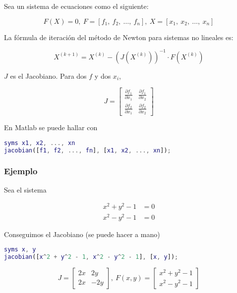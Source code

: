 \documentclass{article}
\begin{document}
Sea un sistema de ecuaciones como el siguiente:

\begin{equation*}
    F(X) = 0,\ F = \left[f_1,\ f_2,\ \dots,\ f_n\right],\ X = \left[x_1,\ x_2,\ \dots,\ x_n\right]
\end{equation*}

La fórmula de iteración del método de Newton para sistemas no lineales es:

\begin{equation}\label{eq:Newton}
    X^{(k+1)} = X^{(k)} - \left(J\left(X^{(k)}\right)\right)^{-1} \cdot F\left(X^{(k)}\right)
\end{equation}

$J$ es el Jacobiano. Para dos $f$ y dos $x_i$,

\begin{equation*}
    J = \begin{bmatrix}
    \frac{\partial f_1}{\partial x_1} & \frac{\partial f_1}{\partial x_2} \\
    \frac{\partial f_2}{\partial x_1} & \frac{\partial f_2}{\partial x_2}
    \end{bmatrix}
\end{equation*}

En Matlab se puede hallar con

\begin{lstlisting}[language=Matlab]
syms x1, x2, ..., xn
jacobian([f1, f2, ..., fn], [x1, x2, ..., xn]);
\end{lstlisting}

\subsubsection{Ejemplo}

Sea el sistema

\begin{align*}
    x^2 + y^2 - 1 &= 0 \\
    x^2 - y^2 - 1 &= 0
\end{align*}

Conseguimos el Jacobiano (se puede hacer a mano)

\begin{lstlisting}[language=Matlab]
syms x, y
jacobian([x^2 + y^2 - 1, x^2 - y^2 - 1], [x, y]);
\end{lstlisting}

\begin{equation*}
    J = \begin{bmatrix}
    2x & 2y \\
    2x & -2y
    \end{bmatrix},\ F(x, y) = \begin{bmatrix}
    x^2 + y^2 - 1 \\
    x^2 - y^2 - 1
    \end{bmatrix}
\end{equation*}
\end{document}
